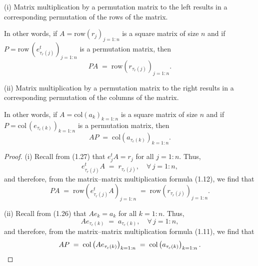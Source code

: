 
\begin{theorem}
(i) Matrix multiplication by a permutation matrix to the left results in a
corresponding permutation of the rows of the matrix.

In other words, if $A = \mathrm{row}(r_j)_{j=1:n}$ is a square matrix of size $n$ and
if $P = \mathrm{row}\,\!\left(e_{\tau_r(j)}^t\right)_{j=1:n}$ is a permutation matrix,
then
\begin{equation}
PA \;=\; \mathrm{row}\left(r_{\tau_r(j)}\right)_{j=1:n}.
\end{equation}

(ii) Matrix multiplication by a permutation matrix to the right results in a
corresponding permutation of the columns of the matrix.

In other words, if $A = \mathrm{col}(a_k)_{k=1:n}$ is a square matrix of size $n$ and
if $P = \mathrm{col}\,\!\left(e_{\tau_c(k)}\right)_{k=1:n}$ is a permutation matrix,
then
\begin{equation}
AP \;=\; \mathrm{col}\left(a_{\tau_c(k)}\right)_{k=1:n}.
\end{equation}
\end{theorem}

\begin{proof}
(i) Recall from (1.27) that $e_j^tA = r_j$ for all $j = 1:n$. Thus,
\[
e_{\tau_r(j)}^tA \;=\; r_{\tau_r(j)}, \quad \forall\, j = 1:n,
\]
and therefore, from the matrix--matrix multiplication formula (1.12), we find that
\[
PA \;=\; \mathrm{row}\left(e_{\tau_r(j)}^tA\right)_{j=1:n} \;=\; \mathrm{row}\left(r_{\tau_r(j)}\right)_{j=1:n}.
\]

(ii) Recall from (1.26) that $Ae_k = a_k$ for all $k = 1:n$. Thus,
\[
Ae_{\tau_c(k)} \;=\; a_{\tau_c(k)}, \quad \forall\, j = 1:n,
\]
and therefore, from the matrix--matrix multiplication formula (1.11), we find that
\[
AP \;=\; \mathrm{col}\left(Ae_{\tau_c(k)}\right)_{k=1:n} \;=\; \mathrm{col}\left(a_{\tau_c(k)}\right)_{k=1:n}.
\qedhere
\]
\end{proof}

